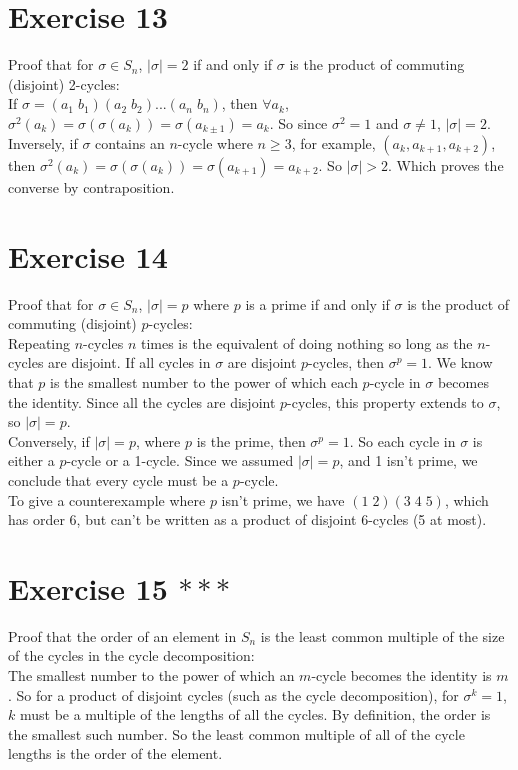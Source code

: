 \documentclass{article}
\begin{document}
    \section*{Exercise 13}
    Proof that for $\sigma \in S_n$, $|\sigma| = 2$
    if and only if $\sigma$ is the product of commuting (disjoint) 2-cycles: \\
    If $\sigma = (a_1\;b_1)(a_2\;b_2)...(a_n\;b_n)$,
    then $\forall a_k$,
    $\sigma^2(a_k) = \sigma(\sigma(a_k)) = \sigma(a_{k \pm 1}) = a_k$.
    So since $\sigma^2 = 1$ and $\sigma \neq 1$,
    $|\sigma| = 2$. \\
    Inversely, if $\sigma$ contains an $n$-cycle where $n \geqslant 3$,
    for example, $(a_k, a_{k+1}, a_{k+2})$,
    then $\sigma^2(a_k) = \sigma(\sigma(a_k)) = \sigma(a_{k+1}) = a_{k+2}$.
    So $|\sigma| > 2$.
    Which proves the converse by contraposition. 


    \section*{Exercise 14}
    Proof that for $\sigma \in S_n$, $|\sigma| = p$ where $p$ is a prime
    if and only if $\sigma$ is the product of commuting (disjoint)
    $p$-cycles: \\
    Repeating $n$-cycles $n$ times is the equivalent of doing nothing
    so long as the $n$-cycles are disjoint.
    If all cycles in $\sigma$ are disjoint $p$-cycles,
    then $\sigma^p = 1$.
    We know that $p$ is the smallest number to the power of which each
    $p$-cycle in $\sigma$ becomes the identity. 
    Since all the cycles are disjoint $p$-cycles,
    this property extends to $\sigma$,
    so $|\sigma| = p$. \\
    Conversely, if $|\sigma| = p$, where $p$ is the prime,
    then $\sigma^p = 1$.
    So each cycle in $\sigma$ is either a $p$-cycle or a 1-cycle.
    Since we assumed $|\sigma| = p$, and 1 isn't prime,
    we conclude that every cycle must be a $p$-cycle. \\
    To give a counterexample where $p$ isn't prime,
    we have $(1\;2)(3\;4\;5)$, which has order 6,
    but can't be written as a product of disjoint $6$-cycles (5 at most).


    \section*{Exercise 15 $***$}
    Proof that the order of an element in $S_n$ is the least common multiple
    of the size of the cycles in the cycle decomposition: \\
    The smallest number to the power of which an $m$-cycle becomes the 
    identity is $m$.
    So for a product of disjoint cycles (such as the cycle decomposition),
    for $\sigma^k = 1$, $k$ must be a multiple of the lengths of all the
    cycles. 
    By definition, the order is the smallest such number.
    So the least common multiple of all of the cycle lengths is the order of
    the element. 
    
\end{document}
